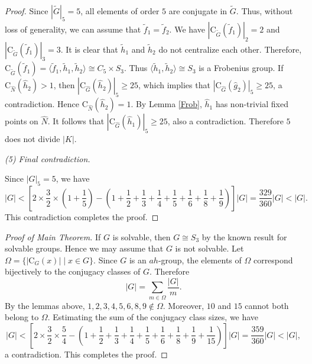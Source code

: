 \documentclass[11pt]{article}
\providecommand{\C}{{\mathrm{C}}}
\providecommand{\gen}[1]{\langle #1 \rangle} %
\providecommand{\gen}[1]{\langle #1 \rangle} %
\providecommand{\gen}[1]{\langle #1 \rangle} %
\providecommand{\wtf}{{\widetilde{f}}}
\providecommand{\wth}{{\widetilde{h}}}
\providecommand{\wtG}{{\widetilde{G}}}
\providecommand{\whg}{{\widehat{g}}}
\providecommand{\whh}{{\widehat{h}}}
\providecommand{\whG}{{\widehat{G}}}
\providecommand{\whN}{{\widehat{N}}}
\begin{document}
\begin{proof}
    Since $|\wtG|_5=5$, all elements of order $5$ are conjugate in $\wtG$.
    Thus, without loss of generality, we can assume that $\wtf_1=\wtf_2$.
    We have $|\C_{\wtG}(\wtf_1)|_2=2$ and $|\C_{\wtG}(\wtf_1)|_3=3$.
    It is clear that $\wth_1$ and $\wth_2$ do not centralize each other.
    Therefore, $\C_{\wtG}(\wtf_1)=\gen{\wtf_1, \wth_1, \wth_2}\cong C_5\times S_3$. 
    Thus $\gen{\wth_1, \wth_2}\cong S_3$ is a Frobenius group.
    If $\C_{\whN}(\whh_2)>1$, then $|\C_{\whG}(\whh_2)|_5\geq 25$,
    which implies that $|\C_{\whG}(\whg_2)|_5\geq 25$, a contradiction.
    Hence $\C_{\whN}(\whh_2) = 1$.
    By Lemma \ref{Frob}, $\whh_1$ has non-trivial fixed points on $\whN$.
    It follows that $|\C_{\whG}(\whh_1)|_5 \geq 25$, also a contradiction.
    Therefore $5$ does not divide $|K|$. 

{\sl  (5) Final contradiction. } 

  Since $|G|_5=5$, we have 
  $$ |G| < [2\times \frac{3}{2}\times (1+\frac{1}{5}) 
    -  (1 + \frac{1}{2} + \frac{1}{3} + \frac{1}{4} + \frac{1}{5} + \frac{1}{6}+ \frac{1}{8} + \frac{1}{9})]|G|
    = \frac{329}{360} |G|< |G| .$$
This contradiction completes the proof.
\end{proof}


\begin{proof}[Proof of Main Theorem]
    If $G$ is solvable, then $G\cong S_3$ by the known result for solvable groups.
    Hence we may assume that $G$ is not solvable.
    Let $\Omega=\{|\C_G(x)|\mid x\in G\}$.
    Since $G$ is an $ah$-group, the elements of $\Omega$ correspond bijectively to the conjugacy classes of $G$.
    Therefore
    $$
        |G|=\sum_{m\in \Omega}\frac{|G|}{m}.
    $$
    By the lemmas above,
    $1,2,3,4,5,6,8,9\notin \Omega$.
    Moreover, $10$ and $15$ cannot both belong to $\Omega$.
    Estimating the sum of the conjugacy class sizes, we have
    $$
        |G| <
        \left[
        2\times \frac{3}{2}\times \frac{5}{4}
        -
        \left(
        1+\frac{1}{2}+\frac{1}{3}+\frac{1}{4}+\frac{1}{5}
        +\frac{1}{6}+\frac{1}{8}+\frac{1}{9}+\frac{1}{15}
        \right)
        \right]|G|
        =
        \frac{359}{360}|G|<|G|,
    $$
    a contradiction.
    This completes the proof.
\end{proof}
    
\end{document}
